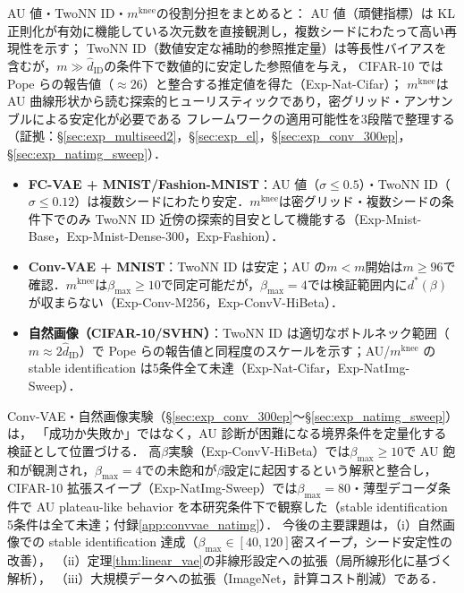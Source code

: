 \documentclass[11pt,a4paper]{jsarticle}
\newcommand{\mknee}{m^{\mathrm{knee}}}
\begin{document}
AU 値・TwoNN ID・$\mknee$の役割分担をまとめると：
AU 値（頑健指標）は KL 正則化が有効に機能している次元数を直接観測し，複数シードにわたって高い再現性を示す；
TwoNN ID（数値安定な補助的参照推定量）は等長性バイアスを含むが，$m \gg \hat{d}_\mathrm{ID}$の条件下で数値的に安定した参照値を与え，
CIFAR-10 では Pope ら\cite{pope2021intrinsic}の報告値（$\approx 26$）と整合する推定値を得た（Exp-Nat-Cifar）；
$\mknee$は AU 曲線形状から読む探索的ヒューリスティックであり，密グリッド・アンサンブルによる安定化が必要である
フレームワークの適用可能性を3段階で整理する（証拠：§\ref{sec:exp_multiseed2}，§\ref{sec:exp_el}，§\ref{sec:exp_conv_300ep}，§\ref{sec:exp_natimg_sweep}）．
\begin{itemize}
  \item \textbf{FC-VAE + MNIST/Fashion-MNIST}：AU 値（$\sigma\leq0.5$）・TwoNN ID（$\sigma\leq0.12$）は複数シードにわたり安定．$\mknee$は密グリッド・複数シードの条件下でのみ TwoNN ID 近傍の探索的目安として機能する（Exp-Mnist-Base，Exp-Mnist-Dense-300，Exp-Fashion）．
  \item \textbf{Conv-VAE + MNIST}：TwoNN ID は安定；AU の$m<m$開始は$m\geq96$で確認．$\mknee$は$\beta_{\max}\geq10$で同定可能だが，$\beta_{\max}=4$では検証範囲内に$d^*(\beta)$が収まらない（Exp-Conv-M256，Exp-ConvV-HiBeta）．
  \item \textbf{自然画像（CIFAR-10/SVHN）}：TwoNN ID は適切なボトルネック範囲（$m\approx2\hat{d}_\mathrm{ID}$）で Pope ら\cite{pope2021intrinsic}の報告値と同程度のスケールを示す；AU/$\mknee$ の stable identification は5条件全て未達（Exp-Nat-Cifar，Exp-NatImg-Sweep）．
\end{itemize}

Conv-VAE・自然画像実験（§\ref{sec:exp_conv_300ep}〜§\ref{sec:exp_natimg_sweep}）は，
「成功か失敗か」ではなく，AU 診断が困難になる境界条件を定量化する検証として位置づける．
高$\beta$実験（Exp-ConvV-HiBeta）では$\beta_{\max} \geq 10$で AU 飽和が観測され，$\beta_{\max}=4$での未飽和が$\beta$設定に起因するという解釈と整合し，
CIFAR-10 拡張スイープ（Exp-NatImg-Sweep）では$\beta_{\max}=80$・薄型デコーダ条件で
AU plateau-like behavior を本研究条件下で観察した（stable identification 5条件は全て未達；付録\ref{app:convvae_natimg}）．
今後の主要課題は，（i）自然画像での stable identification 達成（$\beta_{\max} \in [40,120]$密スイープ，シード安定性の改善），
（ii）定理\ref{thm:linear_vae}の非線形設定への拡張（局所線形化に基づく解析），
（iii）大規模データへの拡張（ImageNet，計算コスト削減）である．
\end{document}
